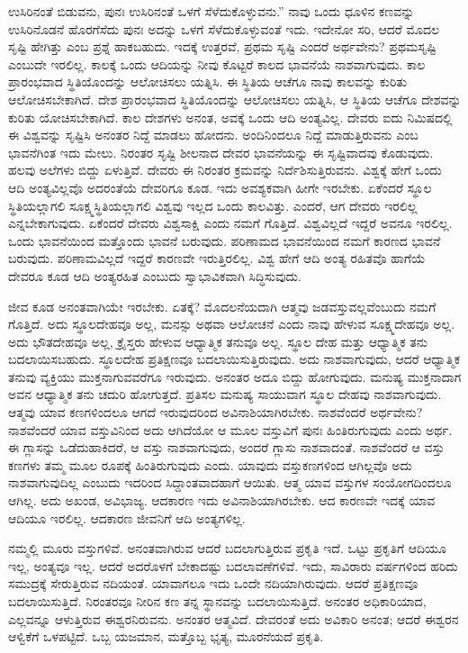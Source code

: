 ಉಸಿರಿನಂತೆ ಬಿಡುವನು, ಪುನಃ ಉಸಿರಿನಂತೆ ಒಳಗೆ ಸೆಳೆದುಕೊಳ್ಳುವನು.” ನಾವು ಒಂದು ಧೂಳಿನ ಕಣವನ್ನು ಉಸಿರಿನೊಡನೆ ಹೊರಗೆಸೆದು ಪುನಃ ಅದನ್ನು ಒಳಗೆ ಸೆಳೆದುಕೊಳ್ಳುವಂತೆ ಇದು. ಇದೇನೋ ಸರಿ, ಆದರೆ ಮೊದಲ ಸೃಷ್ಟಿ ಹೇಗಿತ್ತು ಎಂಬ ಪ್ರಶ್ನೆ ಹಾಕಬಹುದು. ಇದಕ್ಕೆ ಉತ್ತರವೆ, ಪ್ರಥಮ ಸೃಷ್ಟಿ ಎಂದರೆ ಅರ್ಥವೇನು? ಪ್ರಥಮಸೃಷ್ಟಿ ಎಂಬುದೇ ಇರಲಿಲ್ಲ. ಕಾಲಕ್ಕೆ ಒಂದು ಆದಿಯನ್ನು ನೀವು ಕೊಟ್ಟರೆ ಕಾಲದ ಭಾವನೆಯೆ ನಾಶವಾಗುವುದು. ಕಾಲ ಪ್ರಾರಂಭವಾದ ಸ್ಥಿತಿಯೊಂದನ್ನು ಆಲೋಚಿಸಲು ಯತ್ನಿಸಿ. ಈ ಸ್ಥಿತಿಯ ಆಚೆಗೂ ನಾವು ಕಾಲವನ್ನು ಕುರಿತು ಆಲೋಚಿಸಬೇಕಾಗಿದೆ. ದೇಶ ಪ್ರಾರಂಭವಾದ ಸ್ಥಿತಿಯೊಂದನ್ನು ಆಲೋಚಿಸಲು ಯತ್ನಿಸಿ, ಆ ಸ್ಥಿತಿಯ ಆಚೆಗೂ ದೇಶವನ್ನು ಕುರಿತು ಯೋಚಿಸಬೇಕಾಗಿದೆ. ಕಾಲ ದೇಶಗಳು ಅನಂತ, ಅವಕ್ಕೆ ಒಂದು ಆದಿ ಅಂತ್ಯವಿಲ್ಲ. ದೇವರು ಐದು ನಿಮಿಷದಲ್ಲಿ ಈ ವಿಶ್ವವನ್ನು ಸೃಷ್ಟಿಸಿ ಅನಂತರ ನಿದ್ದೆ ಮಾಡಲು ಹೋದನು. ಅಂದಿನಿಂದಲೂ ನಿದ್ದೆ ಮಾಡುತ್ತಿರುವನು ಎಂಬ ಭಾವನೆಗಿಂತ ಇದು ಮೇಲು. ನಿರಂತರ ಸೃಷ್ಟಿ ಶೀಲನಾದ ದೇವರ ಭಾವನೆಯನ್ನು ಈ ಸೃಷ್ಟಿವಾದವು ಕೊಡುವುದು. ಹಲವು ಅಲೆಗಳು ಬಿದ್ದು ಏಳುತ್ತಿವೆ. ದೇವರು ಈ ನಿರಂತರ ಕ್ರಮವನ್ನು ನಿರ್ದೆಶಿಸುತ್ತಿರುವನು. ವಿಶ್ವಕ್ಕೆ ಹೇಗೆ ಒಂದು ಆದಿ ಅಂತ್ಯವಿಲ್ಲವೊ ಅದರಂತೆಯೆ ದೇವರಿಗೂ ಕೂಡ. ಇದು ಅವಶ್ಯಕವಾಗಿ ಹೀಗೇ ಇರಬೇಕು. ಏಕೆಂದರೆ ಸ್ಥೂಲ ಸ್ಥಿತಿಯಲ್ಲಾಗಲಿ ಸೂಕ್ಷ್ಮಸ್ಥಿತಿಯಲ್ಲಾಗಲಿ ವಿಶ್ವವು ಇಲ್ಲದ ಒಂದು ಕಾಲವಿತ್ತು. ಎಂದರೆ, ಆಗ ದೇವರು ಇರಲಿಲ್ಲ ಎನ್ನಬೇಕಾಗುವುದು. ಏಕೆಂದರೆ ದೇವರು ವಿಶ್ವಸಾಕ್ಷಿ ಎಂದು ನಮಗೆ ಗೊತ್ತಿದೆ. ವಿಶ್ವವಿಲ್ಲದೆ ಇದ್ದರೆ ಅವನೂ ಇರಲಿಲ್ಲ. ಒಂದು ಭಾವನೆಯಿಂದ ಮತ್ತೊಂದು ಭಾವನೆ ಬರುವುದು. ಪರಿಣಾಮದ ಭಾವನೆಯಿಂದ ನಮಗೆ ಕಾರಣದ ಭಾವನೆ ಬರುವುದು. ಪರಿಣಾಮವಿಲ್ಲದೆ ಇದ್ದರೆ ಕಾರಣವೇ ಇರುತ್ತಿರಲಿಲ್ಲ. ವಿಶ್ವ ಹೇಗೆ ಆದಿ ಅಂತ್ಯ ರಹಿತವೊ ಹಾಗೆಯೆ ದೇವರೂ ಕೂಡ ಆದಿ ಅಂತ್ಯರಹಿತ ಎಂಬುದು ಸ್ವಾಭಾವಿಕವಾಗಿ ಸಿದ್ಧಿಸುವುದು.

ಜೀವ ಕೂಡ ಅನಂತವಾಗಿಯೇ ಇರಬೇಕು. ಏತಕ್ಕೆ? ಮೊದಲನೆಯದಾಗಿ ಆತ್ಮವು ಜಡವಸ್ತುವಲ್ಲವೆಂಬುದು ನಮಗೆ ಗೊತ್ತಿದೆ. ಅದು ಸ್ಥೂಲದೇಹವೂ ಅಲ್ಲ, ಮನಸ್ಸು ಅಥವಾ ಆಲೋಚನೆ ಎಂದು ನಾವು ಹೇಳುವ ಸೂಕ್ಷ್ಮದೇಹವೂ ಅಲ್ಲ. ಅದು ಭೌತದೇಹವೂ ಅಲ್ಲ, ಕ್ರೈಸ್ತರು ಹೇಳುವ ಆಧ್ಯಾತ್ಮಿಕ ತನುವೂ ಅಲ್ಲ. ಸ್ಥೂಲ ದೇಹ ಮತ್ತು ಆಧ್ಯಾತ್ಮಿಕ ತನು ಬದಲಾಯಿಸಬಹುದು. ಸ್ಥೂಲದೇಹ ಪ್ರತಿಕ್ಷಣವೂ ಬದಲಾಯಿಸುತ್ತಿರುವುದು. ಅದು ನಾಶವಾಗುವುದು, ಆದರೆ ಆಧ್ಯಾತ್ಮಿಕ ತನುವು ವ್ಯಕ್ತಿಯು ಮುಕ್ತನಾಗುವವರೆಗೂ ಇರುವುದು. ಅನಂತರ ಅದೂ ಬಿದ್ದು ಹೋಗುವುದು. ಮನುಷ್ಯ ಮುಕ್ತನಾದಾಗ ಅವನ ಆಧ್ಯಾತ್ಮಿಕ ತನು ಚದುರಿ ಹೋಗುತ್ತದೆ. ಪ್ರತಿಸಲ ಮನುಷ್ಯ ಸಾಯುವಾಗ ಸ್ಥೂಲ ದೇಹವು ನಾಶವಾಗುವುದು. ಆತ್ಮವು ಯಾವ ಕಣಗಳಿಂದಲೂ ಆಗದೆ ಇರುವುದರಿಂದ ಅವಿನಾಶಿಯಾಗಿರಬೇಕು. ನಾಶವೆಂದರೆ ಅರ್ಥವೇನು? ನಾಶವೆಂದರೆ ಯಾವ ವಸ್ತುವಿನಿಂದ ಅದು ಆಗಿದೆಯೋ ಆ ಮೂಲ ವಸ್ತುವಿಗೆ ಪುನಃ ಹಿಂತಿರುಗುವುದು ಎಂದು ಅರ್ಥ. ಈ ಗ್ಲಾಸನ್ನು ಒಡೆದುಹಾಕಿದರೆ, ಆ ವಸ್ತು ನಾಶವಾಗುವುದು, ಅಂದರೆ ಗ್ಲಾಸು ನಾಶವಾದಂತೆ. ನಾಶವೆಂದರೆ ಆ ವಸ್ತು ಕಣಗಳು ತಮ್ಮ ಮೂಲ ರೂಪಕ್ಕೆ ಹಿಂತಿರುಗುವುದು ಎಂದು. ಯಾವುದು ವಸ್ತುಕಣಗಳಿಂದ ಆಗಿಲ್ಲವೊ ಅದು ನಾಶವಾಗುವುದಿಲ್ಲ ಎಂಬುದು ಇದರಿಂದ ಸಿದ್ದಾಂತವಾದಹಾಗೆ ಆಯಿತು. ಆತ್ಮ ಯಾವ ವಸ್ತುಗಳ ಸಂಯೋಗದಿಂದಲೂ ಆಗಿಲ್ಲ. ಅದು ಅಖಂಡ, ಅವಿಭಾಜ್ಯ. ಆದಕಾರಣ ಇದು ಅವಿನಾಶಿಯಾಗಿರಬೇಕು. ಆದ ಕಾರಣವೇ ಇದಕ್ಕೆ ಯಾವ ಆದಿಯೂ ಇರಲಿಲ್ಲ. ಆದಕಾರಣ ಜೀವನಿಗೆ ಆದಿ ಅಂತ್ಯಗಳಿಲ್ಲ.

ನಮ್ಮಲ್ಲಿ ಮೂರು ವಸ್ತುಗಳಿವೆ. ಅನಂತವಾಗಿರುವ ಆದರೆ ಬದಲಾಗುತ್ತಿರುವ ಪ್ರಕೃತಿ ಇದೆ. ಒಟ್ಟು ಪ್ರಕೃತಿಗೆ ಆದಿಯೂ ಇಲ್ಲ, ಅಂತ್ಯವೂ ಇಲ್ಲ. ಆದರೆ ಅದರೊಳಗೆ ಬೇಕಾದಷ್ಟು ಬದಲಾವಣೆಗಳಿವೆ. ಇದು, ಸಾವಿರಾರು ವರ್ಷಗಳಿಂದ ಹರಿದು ಸಮುದ್ರಕ್ಕೆ ಸೇರುತ್ತಿರುವ ನದಿಯಂತೆ. ಯಾವಾಗಲೂ ಇದು ಒಂದೇ ನದಿಯಾಗಿರುವುದು. ಆದರೆ ಪ್ರತಿಕ್ಷಣವೂ ಬದಲಾಯಿಸುತ್ತಿದೆ. ನಿರಂತರವೂ ನೀರಿನ ಕಣ ತನ್ನ ಸ್ಥಾನವನ್ನು ಬದಲಾಯಿಸುತ್ತಿದೆ. ಅನಂತರ ಅಧಿಕಾರಿಯಾದ, ಎಲ್ಲವನ್ನೂ ಆಳುತ್ತಿರುವ ಈಶ್ವರನಿರುವನು. ಅನಂತರ ಆತ್ಮವಿದೆ. ದೇವರಂತೆ ಅದು ಅವಿಕಾರಿ ಅನಂತ; ಆದರೆ ಈಶ್ವರನ ಆಳ್ವಿಕೆಗೆ ಒಳಪಟ್ಟಿದೆ. ಒಬ್ಬ ಯಜಮಾನ, ಮತ್ತೊಬ್ಬ ಭೃತ್ಯ, ಮೂರನೆಯದೆ ಪ್ರಕೃತಿ.

